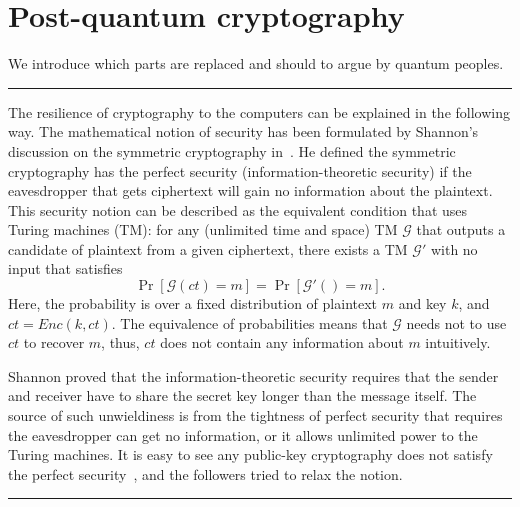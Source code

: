 


\newcommand{\memo}[1]{{\color{red} #1 }}


%
% 


\clearpage

\section{Post-quantum cryptography}


We introduce which parts are replaced and should to argue by quantum peoples.

\rule{\columnwidth}{1pt}

The resilience of cryptography to the computers can be explained in the following way.
The mathematical notion of security has been formulated by Shannon's discussion on the symmetric cryptography in~\cite{Sha49}.
He defined the symmetric cryptography has the perfect security (information-theoretic security) if the eavesdropper that gets ciphertext will gain no information about the plaintext.
This security notion can be described as the equivalent condition that 
uses Turing machines (TM):
for any (unlimited time and space) TM $\mathcal{G}$ that outputs a candidate of plaintext from a given ciphertext, there exists a TM $\mathcal{G}'$ with no input that satisfies
%
\begin{equation}
	\label{eqn:ITalg}
	\Pr[ \mathcal{G}(ct) = m ] = \Pr [\mathcal{G}'() = m ].
\end{equation}
%
Here, the probability is over a fixed distribution of plaintext $m$ and key $k$, and $ct = Enc(k,ct)$.  
The equivalence of probabilities means that $\mathcal{G}$ needs not to use $ct$ to recover $m$, thus, $ct$ does not contain any information about $m$ intuitively.

Shannon proved that the information-theoretic security 
requires that the sender and receiver have to share 
the secret key longer than the message itself.
The source of such unwieldiness is from the tightness of perfect security that requires the eavesdropper can get no information, or it allows unlimited power to the Turing machines.
It is easy to see any public-key cryptography does not satisfy
the perfect security~\cite[Sect. 5.5.2]{GolEnc2}, 
and the followers tried to relax the notion.

\rule{\columnwidth}{1pt}

